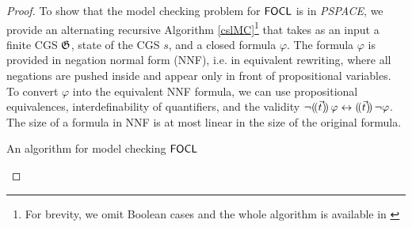 \documentclass{article}
\begin{document}
\begin{proof}
To show that the model checking problem for $\mathsf{FOCL}$ is in \textit{PSPACE}, we provide an alternating recursive Algorithm \ref{cslMC}\footnote{For brevity, we omit Boolean cases and the whole algorithm is available in %
\cite{csl}} 
that takes as an input a finite CGS $\mathfrak{G}$, state of the CGS $s$, and a closed formula $\varphi$. The formula $\varphi$ is provided in negation normal form (NNF), i.e. in equivalent rewriting, where all negations are pushed inside and appear only in front of propositional variables. To convert $\varphi$ into the equivalent NNF formula, we can use propositional equivalences, interdefinability of quantifiers, and the validity  $\neg (\!( \Vec{t} )\!)\,\varphi \leftrightarrow (\!( \vec{t } )\!)\,\neg \varphi$. The size of a formula in NNF is at most linear in the size of the original formula.
\begin{algorithm}
	\caption{An algorithm for model checking $\mathsf{FOCL}$} \label{cslMC} 
	\begin{algorithmic}[1] 		
        \EndCase

\end{algorithmic}
\end{algorithm}
\end{proof}
\end{document}
